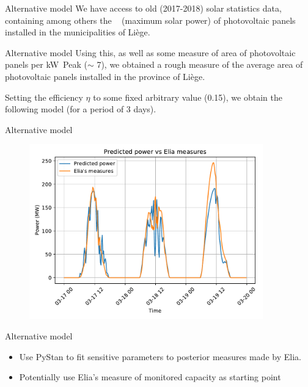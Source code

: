 \documentclass[12pt]{beamer}
\begin{document}
\begin{frame}{Alternative model}
    We have access to old (2017-2018) solar statistics data, containing among others the \si{\kilo\voltampere} (maximum solar power) of photovoltaic panels installed in the municipalities of Liège.
\end{frame}

\begin{frame}{Alternative model}
    Using this, as well as some measure of area of photovoltaic panels per \si{\kilo\watt Peak} ($\sim$ 7), we obtained a rough measure of the average area of photovoltaic panels installed in the province of Liège.
    
    Setting the efficiency $\eta$ to some fixed arbitrary value (\num{0.15}), we obtain the following model (for a period of 3 days).
\end{frame}

\begin{frame}{Alternative model}
    \begin{figure}
        \centering
        \includegraphics[width=0.9\textwidth]{resources/pdf/province.pdf}
    \end{figure}
\end{frame}

\begin{frame}{Alternative model}
    \begin{itemize}
        \item Use PyStan to fit sensitive parameters to posterior measures made by Elia.
        \item Potentially use Elia's measure of monitored capacity as starting point
    \end{itemize}
\end{frame}
\end{document}
